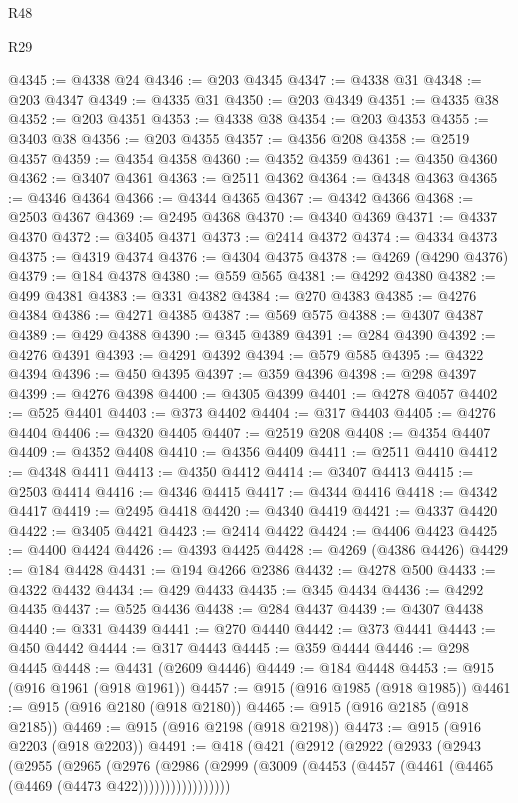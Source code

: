 \begin{lexlean}{R48}
\begin{lexlean}{R29}
\begin{coremodule}
{{{{{{{{{{{{{{{{{{{{{{{{{{{{{{{{{{{{{{{{{{{{{{{{{{{{{{{{{{{{{{{{{{{{{{{{{{{{{{{{{{{{{{{{{{{{{{{{{{{{{{{{{{{{{{{{{{{{{{{{{{{{{{{{{{{{{{{{{{{{{{{{{{{{{{{{{{{{{{{{{{{{{{{{{{{{{{{{{{{{{{{{{{{{{{{{{{{{{{{{{{{{{{{{{{{{{{{{{{@4345 := @4338 @24
@4346 := @203 @4345
@4347 := @4338 @31
@4348 := @203 @4347
@4349 := @4335 @31
@4350 := @203 @4349
@4351 := @4335 @38
@4352 := @203 @4351
@4353 := @4338 @38
@4354 := @203 @4353
@4355 := @3403 @38
@4356 := @203 @4355
@4357 := @4356 @208
@4358 := @2519 @4357
@4359 := @4354 @4358
@4360 := @4352 @4359
@4361 := @4350 @4360
@4362 := @3407 @4361
@4363 := @2511 @4362
@4364 := @4348 @4363
@4365 := @4346 @4364
@4366 := @4344 @4365
@4367 := @4342 @4366
@4368 := @2503 @4367
@4369 := @2495 @4368
@4370 := @4340 @4369
@4371 := @4337 @4370
@4372 := @3405 @4371
@4373 := @2414 @4372
@4374 := @4334 @4373
@4375 := @4319 @4374
@4376 := @4304 @4375
@4378 := @4269 (@4290 @4376)
@4379 := @184 @4378
@4380 := @559 @565
@4381 := @4292 @4380
@4382 := @499 @4381
@4383 := @331 @4382
@4384 := @270 @4383
@4385 := @4276 @4384
@4386 := @4271 @4385
@4387 := @569 @575
@4388 := @4307 @4387
@4389 := @429 @4388
@4390 := @345 @4389
@4391 := @284 @4390
@4392 := @4276 @4391
@4393 := @4291 @4392
@4394 := @579 @585
@4395 := @4322 @4394
@4396 := @450 @4395
@4397 := @359 @4396
@4398 := @298 @4397
@4399 := @4276 @4398
@4400 := @4305 @4399
@4401 := @4278 @4057
@4402 := @525 @4401
@4403 := @373 @4402
@4404 := @317 @4403
@4405 := @4276 @4404
@4406 := @4320 @4405
@4407 := @2519 @208
@4408 := @4354 @4407
@4409 := @4352 @4408
@4410 := @4356 @4409
@4411 := @2511 @4410
@4412 := @4348 @4411
@4413 := @4350 @4412
@4414 := @3407 @4413
@4415 := @2503 @4414
@4416 := @4346 @4415
@4417 := @4344 @4416
@4418 := @4342 @4417
@4419 := @2495 @4418
@4420 := @4340 @4419
@4421 := @4337 @4420
@4422 := @3405 @4421
@4423 := @2414 @4422
@4424 := @4406 @4423
@4425 := @4400 @4424
@4426 := @4393 @4425
@4428 := @4269 (@4386 @4426)
@4429 := @184 @4428
@4431 := @194 @4266 @2386
@4432 := @4278 @500
@4433 := @4322 @4432
@4434 := @429 @4433
@4435 := @345 @4434
@4436 := @4292 @4435
@4437 := @525 @4436
@4438 := @284 @4437
@4439 := @4307 @4438
@4440 := @331 @4439
@4441 := @270 @4440
@4442 := @373 @4441
@4443 := @450 @4442
@4444 := @317 @4443
@4445 := @359 @4444
@4446 := @298 @4445
@4448 := @4431 (@2609 @4446)
@4449 := @184 @4448
@4453 := @915 (@916 @1961 (@918 @1961))
@4457 := @915 (@916 @1985 (@918 @1985))
@4461 := @915 (@916 @2180 (@918 @2180))
@4465 := @915 (@916 @2185 (@918 @2185))
@4469 := @915 (@916 @2198 (@918 @2198))
@4473 := @915 (@916 @2203 (@918 @2203))
@4491 := @418
    (@421
      (@2912
        (@2922
          (@2933
            (@2943
              (@2955
                (@2965
                  (@2976
                    (@2986
                      (@2999 (@3009 (@4453 (@4457 (@4461 (@4465 (@4469 (@4473 @422)))))))))))))))))
}}}}}}}}}}}}}}}}}}}}}}}}}}}}}}}}}}}}}}}}}}}}}}}}}}}}}}}}}}}}}}}}}}}}}}}}}}}}}}}}}}}}}}}}}}}}}}}}}}}}}}}}}}}}}}}}}}}}}}}}}}}}}}}}}}}}}}}}}}}}}}}}}}}}}}}}}}}}}}}}}}}}}}}}}}}}}}}}}}}}}}}}}}}}}}}}}}}}}}}}}}}}}}}}}}}}}}}}}}
\end{coremodule}
\end{lexlean}
\end{lexlean}

